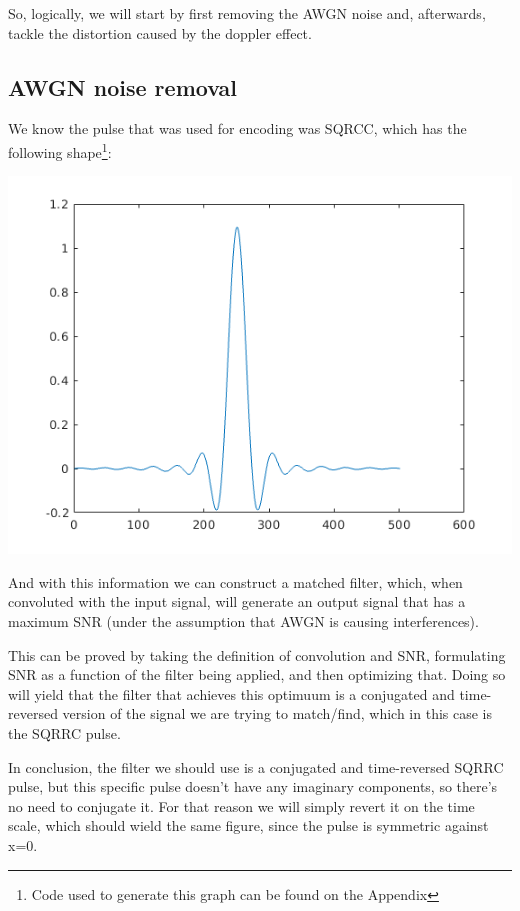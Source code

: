 \documentclass[conference,9pt]{IEEEtran}
\begin{document}
So, logically, we will start by first removing the AWGN noise and, afterwards, tackle the distortion caused by the doppler effect.

\subsection{AWGN noise removal}
We know the pulse that was used for encoding was SQRCC, which has the following shape\footnote{Code used to generate this graph can be found on the Appendix}:

\includegraphics[scale=0.6]{pulso1}

And with this information we can construct a matched filter, which, when convoluted with the input signal, will generate an output signal that has a maximum SNR (under the assumption that AWGN is causing interferences)\cite{matched}.

This can be proved by taking the definition of convolution and SNR, formulating SNR as a function of the filter being applied, and then optimizing that. Doing so will yield that the filter that achieves this optimuum is a conjugated and time-reversed version\cite{proof} of the signal we are trying to match/find, which in this case is the SQRRC pulse.

In conclusion, the filter we should use is a conjugated and time-reversed SQRRC pulse, but this specific pulse doesn't have any imaginary components, so there's no need to conjugate it. For that reason we will simply revert it on the time scale, which should wield the same figure, since the pulse is symmetric against x=0.
\end{document}
